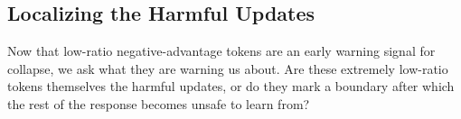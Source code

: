 



\subsection{Localizing the Harmful Updates}
\label{subsec:localizing_harmful_updates}

Now that low-ratio negative-advantage tokens are an early
warning signal for collapse, we ask what they are warning us about. Are
these extremely low-ratio tokens themselves the harmful updates, or do they mark
a boundary after which the rest of the response becomes unsafe to learn from?


